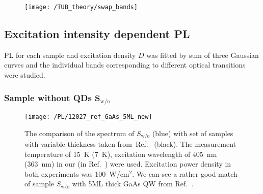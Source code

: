 \begin{figure}
	\centering
	\texttt{[image: /TUB\_theory/swap\_bands]}
	\caption{{ }}
	\label{fig:Gamma_L_reverse}
\end{figure}
	


\newpage
\subsection{Excitation intensity dependent PL}
\label{sec:intensity_PL_TU}
PL for each sample and excitation density $D$ was fitted by sum of three Gaussian curves and the individual bands corresponding to different optical transitions were studied. 

\subsubsection*{Sample without QDs $\mathbf{S_\mathrm{w/o}}$}
\label{Sec:PL_int_wo}
\begin{figure}
	\centering
	\texttt{[image: /PL/12027\_ref\_GaAs\_5ML\_new]}
	\caption{The comparison of the spectrum of $S_\mathrm{w/o}$ (blue) with set of samples with variable thickness taken from~Ref.~\citep{Prieto_APL1997} (black). The measurement temperature of 15~K (7~K), excitation wavelength of 405~nm (363~nm) in our (in Ref.~\citep{Prieto_APL1997}) were used. Excitation power density in both experiments was 100~W/cm$^2$. We can see a rather good match of sample $S_\mathrm{w/o}$ with 5ML thick GaAs QW from Ref.~\citep{Prieto_APL1997}.}
	\label{fig:12027_ref}
\end{figure}


